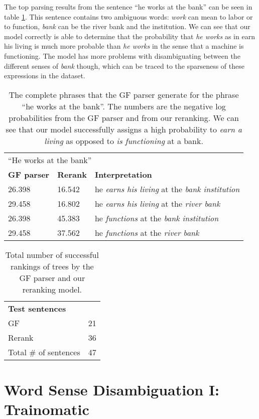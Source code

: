 The top parsing results from the sentence ``he works at the bank'' can be seen in table \ref{tab:worksbank}. This sentence contains two ambiguous words: \emph{work} can mean to labor or to function, \emph{bank} can be the river bank and the institution. We can see that our model correctly is able to determine that the probability that \emph{he works} as in earn his living is much more probable than \emph{he works} in the sense that a machine is functioning. The model has more problems with disambiguating between the different senses of \emph{bank} though, which can be traced to the sparseness of these expressions in the dataset.


\begin{table}[htbp]
\centering
\begin{tabular}{lll}
\multicolumn{3}{l}{``He works at the bank''}\\
\textbf{GF parser} & \textbf{Rerank} & \textbf{Interpretation}\\
26.398 & 16.542 & he \emph{earns his living} at the \emph{bank institution}  \\
29.458 & 16.802 & he \emph{earns his living} at the \emph{river bank} \\
26.398 & 45.383 & he \emph{functions} at the \emph{bank institution}\\
29.458 & 37.562 & he \emph{functions} at the \emph{river bank}   
\end{tabular}
\caption{The complete phrases that the GF parser generate for the phrase ``he works at the bank''. The numbers are the negative log probabilities from the GF parser and from our reranking. We can see that our model successfully assigns a high probability to \emph{earn a living} as opposed to \emph{is functioning} at a bank.}
\label{tab:worksbank}
\end{table}

\begin{table}[htbp]
\centering
\begin{tabular}{ll}
\multicolumn{2}{l}{\bf Test sentences}\\
GF & 21 \\
Rerank & 36 \\
Total \# of sentences & 47   
\end{tabular}
\caption{Total number of successful rankings of trees by the GF parser and our reranking model. }
\label{tab:gfparser}
\end{table}


\section{Word Sense Disambiguation I: Trainomatic}

